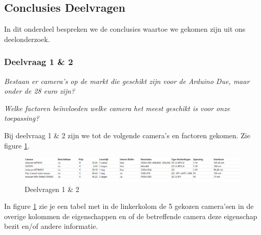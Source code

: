\documentclass{article}
\begin{document}
\subsection{Conclusies Deelvragen}
In dit onderdeel bespreken we de conclusies waartoe we gekomen zijn uit ons deelonderzoek. 

\subsubsection{Deelvraag 1 {\&} 2}
\textit{Bestaan er camera’s op de markt die geschikt zijn voor de Arduino Due, maar onder de 28 euro zijn?}


\textit{Welke factoren beïnvloeden welke camera het meest geschikt is voor onze toepassing?}

Bij deelvraag 1 \& 2 zijn we tot de volgende camera’s en factoren gekomen.
Zie figure \ref{fig:deelvragen1en2}.


\begin{figure}[h]
	\includegraphics[width=40em]{table2}
	\centering
	\caption{Deelvragen 1 {\&} 2}
	\label{fig:deelvragen1en2}
	\end{figure}

In figure \ref{fig:deelvragen1en2} zie je een tabel met in de linkerkolom de 5 gekozen camera'sen in de overige kolommen de eigenschappen en of de betreffende camera deze eigenschap bezit en/of andere informatie. 
\end{document}
